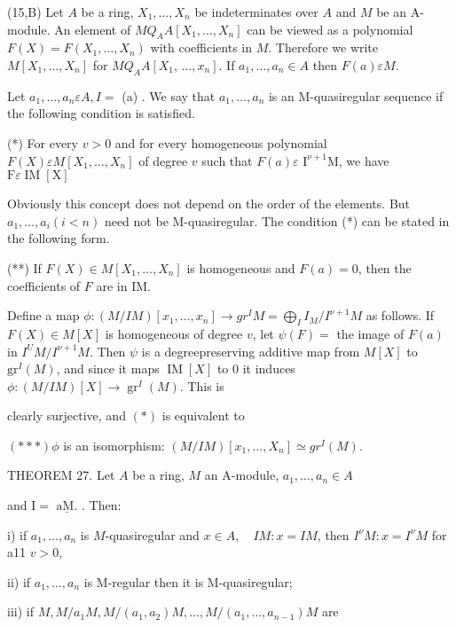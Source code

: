 (15,B) Let $A$ be a ring, $X_{1}, \ldots, X_{n}$ be indeterminates over $A$ and $M$ be an A-module. An element of $M Q_{A} A\left[X_{1}, \ldots, X_{n}\right]$ can be viewed as a polynomial $F(X)=F\left(X_{1}, \ldots, X_{n}\right)$ with coefficients in $M$. Therefore we write $M\left[X_{1}, \ldots, X_{n}\right]$ for $M Q_{A} A\left[X_{1}\right.$, $\left.\ldots, x_{n}\right]$. If $a_{1}, \ldots, a_{n} \in A$ then $F(a) \varepsilon M$.

Let $a_{1}, \ldots, a_{n} \varepsilon A, I=$ (a) . We say that $a_{1}, \ldots, a_{n}$ is an M-quasiregular sequence if the following condition is satisfied.

(*) For every $v>0$ and for every homogeneous polynomial $F(X) \varepsilon M\left[X_{1}, \ldots, X_{n}\right]$ of degree $v$ such that $F(a) \varepsilon$ $\mathrm{I}^{\nu+1} \mathrm{M}$, we have $\mathrm{F} \varepsilon \operatorname{IM}[\mathrm{X}]$

Obviously this concept does not depend on the order of the elements. But $a_{1}, \ldots, a_{i}(i<n)$ need not be M-quasiregular. The condition (*) can be stated in the following form.

(**) If $F(X) \in M\left[X_{1}, \ldots, X_{n}\right]$ is homogeneous and $F(a)=0$, then the coefficients of $F$ are in IM.

Define a map $\phi:(M / I M)\left[x_{1}, \ldots, x_{n}\right] \rightarrow g r^{I} M=\bigoplus_{I} I_{M} / I^{\nu+1} M$ as follows. If $F(X) \in M[X]$ is homogeneous of degree $v$, let $\psi(F)=$ the image of $F(a)$ in $I^{U} M / I^{\nu+1} M$. Then $\psi$ is a degreepreserving additive map from $M[X]$ to $\mathrm{gr}^{I}(M)$, and since it maps $\operatorname{IM}[X]$ to 0 it induces $\phi:(M / I M)[X] \rightarrow \operatorname{gr}^{I}(M)$. This is

clearly surjective, and $(*)$ is equivalent to

$(* * *) \phi$ is an isomorphism: $(M / I M)\left[x_{1}, \ldots, X_{n}\right] \simeq g r^{I}(M) .$

THEOREM 27. Let $A$ be a ring, $M$ an A-module, $a_{1}, \ldots, a_{n} \in A$

and $\mathrm{I}=\underline{\text { aM. }}$. Then:

i) if $a_{1}, \ldots, a_{n}$ is $M$-quasiregular and $x \in A, \quad I M: x=I M$, then $I^{\nu} M: x=I^{\nu} M$ for a11 $v>0$,

ii) if $a_{1}, \ldots, a_{n}$ is M-regular then it is M-quasiregular;

iii) if $M, M / a_{1} M, M /\left(a_{1}, a_{2}\right) M, \ldots, M /\left(a_{1}, \ldots, a_{n-1}\right) M$ are

